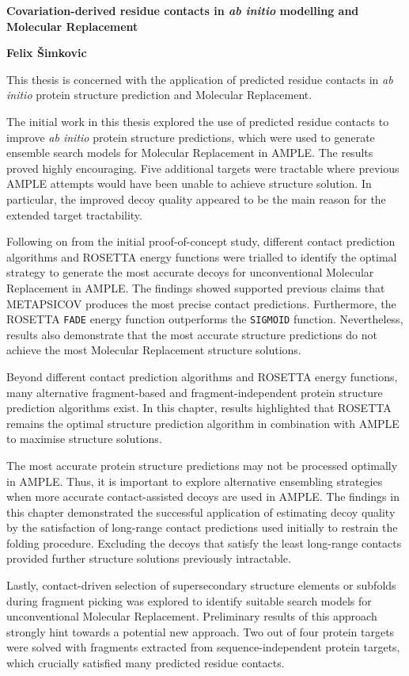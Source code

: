 \begin{center}
    \Large
    \textbf{Covariation-derived residue contacts in \textit{ab initio} modelling and Molecular Replacement}

    \vspace{0.5cm}
    \textbf{Felix \v{S}imkovic}
    \vspace{0.5cm}
\end{center}

This thesis is concerned with the application of predicted residue contacts in \textit{ab initio} protein structure prediction and Molecular Replacement.

The initial work in this thesis explored the use of predicted residue contacts to improve \textit{ab initio} protein structure predictions, which were used to generate ensemble search models for Molecular Replacement in AMPLE. The results proved highly encouraging. Five additional targets were tractable where previous AMPLE attempts would have been unable to achieve structure solution. In particular, the improved decoy quality appeared to be the main reason for the extended target tractability.

Following on from the initial proof-of-concept study, different contact prediction algorithms and ROSETTA energy functions were trialled to identify the optimal strategy to generate the most accurate decoys for unconventional Molecular Replacement in AMPLE. The findings showed supported previous claims that METAPSICOV produces the most precise contact predictions. Furthermore, the ROSETTA \texttt{FADE} energy function outperforms the \texttt{SIGMOID} function. Nevertheless, results also demonstrate that the most accurate structure predictions do not achieve the most Molecular Replacement structure solutions. 

Beyond different contact prediction algorithms and ROSETTA energy functions, many alternative fragment-based and fragment-independent protein structure prediction algorithms exist. In this chapter, results highlighted that ROSETTA remains the optimal structure prediction algorithm in combination with AMPLE to maximise structure solutions. 

The most accurate protein structure predictions may not be processed optimally in AMPLE. Thus, it is important to explore alternative ensembling strategies when more accurate contact-assisted decoys are used in AMPLE. The findings in this chapter demonstrated the successful application of estimating decoy quality by the satisfaction of long-range contact predictions used initially to restrain the folding procedure. Excluding the decoys that satisfy the least long-range contacts provided further structure solutions previously intractable.

Lastly, contact-driven selection of supersecondary structure elements or subfolds during fragment picking was explored to identify suitable search models for unconventional Molecular Replacement. Preliminary results of this approach strongly hint towards a potential new approach. Two out of four protein targets were solved with fragments extracted from sequence-independent protein targets, which crucially satisfied many predicted residue contacts.

\clearpage
